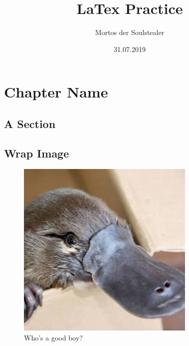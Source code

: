 \documentclass[a4paper,12pt,]{report}
\begin{document}
\title{\Large{\textbf{LaTex Practice}}}
\author{Mortos der Soulstealer}
\date{31.07.2019}

\maketitle

\tableofcontents

\setcounter{page}{2}

\fancyhf{}
\renewcommand{\headrulewidth}{2pt}
\renewcommand{\footrulewidth}{2pt}

\fancyhead[LE]{\leftmark}
\fancyhead[RO]{\nouppercase{\rightmark}}
\fancyfoot[LE,RO]{\thepage}



\chapter{Chapter Name}
\blindmathtrue
\blindtext[5]

\section{A Section}
\blindtext[2]
\blinditemize
\blindenumerate
\pagebreak

\section*{Wrap Image}
\begingroup
\setlength{\intextsep}{0pt}
\setlength{\columnsep}{15pt}

\begin{figure}
\centering
\includegraphics[width=\linewidth]{Platypus.jpg}
\caption{Who's a good boy?}\label{fig:fuzzyduck}
\end{figure}
\blindtext
\end{document}

